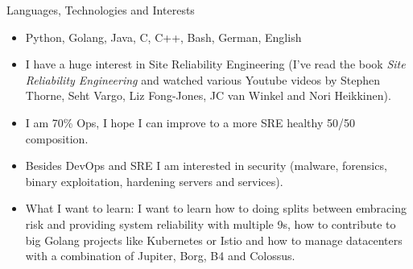 \documentclass[]{mcdowellcv}
\begin{document}
\begin{cvsection}{Languages, Technologies and Interests}
\begin{cvsubsection}{}{}{}
\begin{itemize}
\item Python, Golang, Java, C, C++, Bash, German, English
\item I have a huge interest in Site Reliability Engineering (I've read the book \emph{Site Reliability Engineering} and watched various Youtube videos by Stephen Thorne, Seht Vargo, Liz Fong-Jones, JC van Winkel and Nori Heikkinen).
\item I am 70\% Ops, I hope I can improve to a more SRE healthy 50/50 composition.
\item Besides DevOps and SRE I am interested in security (malware, forensics, binary exploitation, hardening servers and services).
\item What I want to learn: I want to learn how to doing splits between embracing risk and providing system reliability with multiple 9s, how to contribute to big Golang projects like Kubernetes or Istio and how to manage datacenters with a combination of Jupiter, Borg, B4 and Colossus.
\end{itemize}
\end{cvsubsection}
\end{cvsection}
\end{document}
